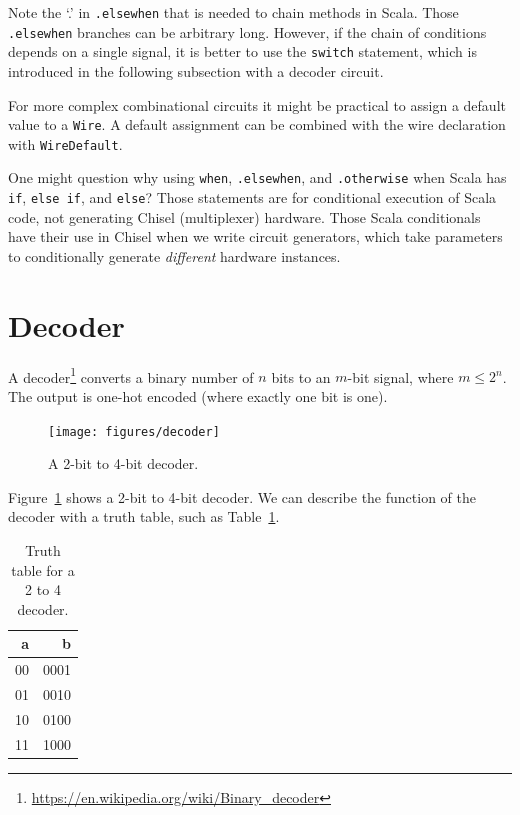 \documentclass[%
    10pt,
    headinclude, footexclude,
    openright, %
    notitlepage,
    cleardoubleempty,
    headsepline,
    pointlessnumbers,
    bibtotoc, idxtotoc,
    ]{scrbook}
\newcommand{\code}[1]{{\small{\texttt{#1}}}}
\newcommand{\myref}[2]{\href{#1}{#2}}
\renewcommand{\myref}[2]{{#2}{\footnote{\url{#1}}}}
\begin{document}
Note the `.' in \code{.elsewhen} that is needed to chain methods in Scala.
Those \code{.elsewhen} branches can be arbitrary long.
However, if the chain of conditions depends on a single signal, it is better
to use the \code{switch} statement, which is introduced in the following
subsection with a decoder circuit.

For more complex combinational circuits it might be practical to assign
a default value to a \code{Wire}. A default assignment can be combined with the wire
declaration with \code{WireDefault}.


One might question why using \code{when}, \code{.elsewhen}, and \code{.otherwise}
when Scala has \code{if}, \code{else if}, and \code{else}? Those statements are for
conditional execution of Scala code, not generating Chisel (multiplexer) hardware.
Those Scala conditionals have their use in Chisel when we write circuit generators,
which take parameters to conditionally generate \emph{different} hardware instances.

\section{Decoder}


A \myref{https://en.wikipedia.org/wiki/Binary_decoder}{decoder}
converts a binary number of $n$ bits to an $m$-bit signal, where $m \leq 2^n$.
The output is one-hot encoded (where exactly one bit is one).

\begin{figure}
  \centering
  \texttt{[image: figures/decoder]}
  \caption{A 2-bit to 4-bit decoder.}
  \label{fig:decoder}
\end{figure}

Figure~\ref{fig:decoder} shows a 2-bit to 4-bit decoder. We can describe the function
of the decoder with a truth table, such as Table~\ref{tab:decoder}.

\begin{table}
 \centering
 \label{tab:decoder}
  \begin{tabular}{rr}
    \toprule
    a & b \\
    \midrule
    00 & 0001 \\
    01 & 0010 \\
    10 & 0100 \\
    11 & 1000 \\
    \bottomrule 
  \end{tabular} 
  \caption{Truth table for a 2 to 4 decoder.}
\end{table}
\end{document}
